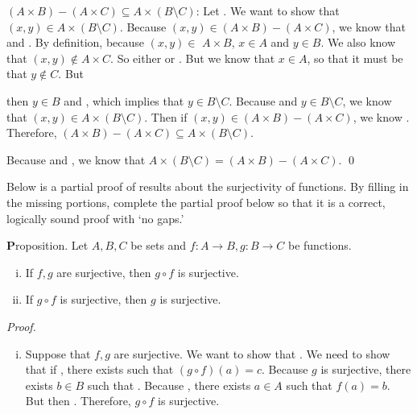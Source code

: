 \documentclass[12pt,letterpaper]{exam}
\newcommand{\blank}[1]{\underline{\hspace{#1}}} %
\begin{document}
\begin{questions}
$(A \times B) - (A \times C) \subseteq A \times (B \setminus C)$: Let \blank{6cm}. We want to \pspace show that $(x, y) \in A \times (B \setminus C)$. Because $(x, y) \in (A \times B) - (A \times C)$, we know that \pspace \blank{4.5cm} and \blank{4.5cm}. By definition, because $(x, y) \in$ \pspace $A \times B$, $x \in A$ and $y \in B$. We also know that $(x, y) \notin A \times C$. So either \blank{4cm} \pspace or \blank{4cm}. But we know that $x \in A$, so that it must be that $y \notin C$. But \newpage

\phantom{.}\par\vspace{0.3cm} then $y \in B$ and \blank{3cm}, which implies that $y \in B \setminus C$. Because \blank{3cm} \pspace and $y \in B \setminus C$, we know that $(x, y) \in A \times (B \setminus C)$. Then if $(x, y) \in (A \times B) - (A \times C)$, \pspace we know \blank{6cm}. Therefore, $(A \times B) - (A \times C) \subseteq A \times (B \setminus C)$. \par\vspace{2\baselineskip}

Because \blank{5.5cm} and \blank{5.5cm}, we know \pspace that $A \times (B \setminus C)= (A \times B) - (A \times C)$. \qed



\newpage
\question[10]  Below is a partial proof of results about the surjectivity of functions. By filling in the missing portions, complete the partial proof below so that it is a correct, logically sound proof with `no gaps.' \pspace

{\textbf Proposition.} Let $A, B, C$ be sets and $f: A \to B, g: B \to C$ be functions. 
	\begin{enumerate}[(i)]
	\item If $f, g$ are surjective, then $g \circ f$ is surjective. 
	\item If $g \circ f$ is surjective, then $g$ is surjective. 
	\end{enumerate} \pspace

{\itshape Proof.} 

\begin{enumerate}[(i)]
\item Suppose that $f, g$ are surjective. We want to show that \blank{5cm}. \pspace We need to show that if \blank{3cm}, there exists \blank{3cm} such that \pspace $(g \circ f)(a)= c$. Because $g$ is surjective, there exists $b \in B$ such that \blank{3cm}. \pspace Because \blank{4.5cm}, there exists $a \in A$ such that $f(a)= b$. But then \pspace \blank{7cm}. Therefore, $g \circ f$ is surjective. \par\vspace{2\baselineskip}


\end{enumerate}
\end{questions}
\end{document}
